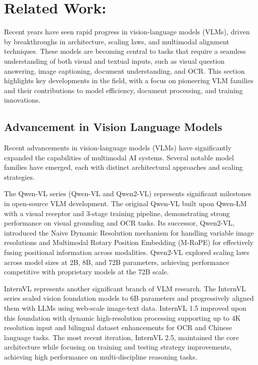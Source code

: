 \section{Related Work: }
Recent years have seen rapid progress in vision-language models (VLMs), driven by breakthroughs in architecture, scaling laws, and multimodal alignment techniques. These models are becoming central to tasks that require a seamless understanding of both visual and textual inputs, such as visual question answering, image captioning, document understanding, and OCR. This section highlights key developments in the field, with a focus on pioneering VLM families and their contributions to model efficiency, document processing, and training innovations. 

\subsection{Advancement in Vision Language Models}
Recent advancements in vision-language models (VLMs) have significantly expanded the capabilities of multimodal AI systems. Several notable model families have emerged, each with distinct architectural approaches and scaling strategies. 

The Qwen-VL\cite{bai2023qwenvlversatilevisionlanguagemodel} \cite{wang2024qwen2vlenhancingvisionlanguagemodels} series (Qwen-VL and Qwen2-VL) represents significant milestones in open-source VLM development. The original Qwen-VL\cite{bai2023qwenvlversatilevisionlanguagemodel} built upon Qwen-LM with a visual receptor and 3-stage training pipeline, demonstrating strong performance on visual grounding and OCR tasks. Its successor, Qwen2-VL, introduced the Naive Dynamic Resolution mechanism\cite{wang2024qwen2vlenhancingvisionlanguagemodels} for handling variable image resolutions and Multimodal Rotary Position Embedding (M-RoPE)\cite{wang2024qwen2vlenhancingvisionlanguagemodels} for effectively fusing positional information across modalities. Qwen2-VL explored scaling laws across model sizes at 2B, 8B, and 72B parameters, achieving performance competitive with proprietary models at the 72B scale. 

InternVL represents another significant branch of VLM research. The InternVL series scaled vision foundation models to 6B parameters and progressively aligned them with LLMs using web-scale image-text data. InternVL 1.5\cite{chen2024fargpt4vclosinggapInternvl1.5} improved upon this foundation with dynamic high-resolution processing supporting up to 4K resolution input and bilingual dataset enhancements for OCR and Chinese language tasks. The most recent iteration, InternVL 2.5\cite{chen2025expandingperformanceboundariesopensourceinternvl2.5}, maintained the core architecture while focusing on training and testing strategy improvements, achieving high performance on multi-discipline reasoning tasks. 

